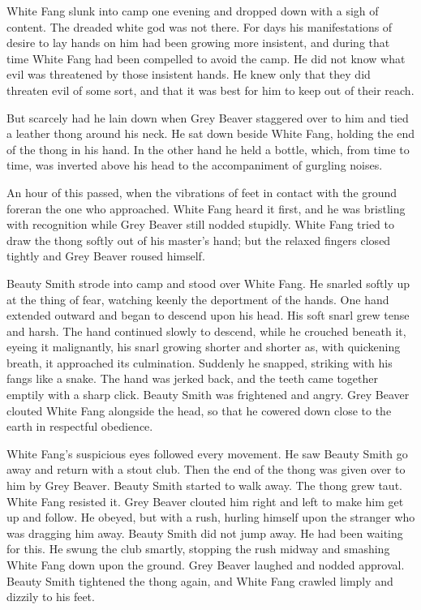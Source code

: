 \documentclass[10pt]{book}
\begin{document}
White Fang slunk into camp one evening and dropped down with a sigh of
content. The dreaded white god was not there. For days his
manifestations of desire to lay hands on him had been growing more
insistent, and during that time White Fang had been compelled to avoid
the camp. He did not know what evil was threatened by those insistent
hands. He knew only that they did threaten evil of some sort, and that
it was best for him to keep out of their reach.

But scarcely had he lain down when Grey Beaver staggered over to him
and tied a leather thong around his neck. He sat down beside White
Fang, holding the end of the thong in his hand. In the other hand he
held a bottle, which, from time to time, was inverted above his head to
the accompaniment of gurgling noises.

An hour of this passed, when the vibrations of feet in contact with the
ground foreran the one who approached. White Fang heard it first, and
he was bristling with recognition while Grey Beaver still nodded
stupidly. White Fang tried to draw the thong softly out of his master’s
hand; but the relaxed fingers closed tightly and Grey Beaver roused
himself.

Beauty Smith strode into camp and stood over White Fang. He snarled
softly up at the thing of fear, watching keenly the deportment of the
hands. One hand extended outward and began to descend upon his head.
His soft snarl grew tense and harsh. The hand continued slowly to
descend, while he crouched beneath it, eyeing it malignantly, his snarl
growing shorter and shorter as, with quickening breath, it approached
its culmination. Suddenly he snapped, striking with his fangs like a
snake. The hand was jerked back, and the teeth came together emptily
with a sharp click. Beauty Smith was frightened and angry. Grey Beaver
clouted White Fang alongside the head, so that he cowered down close to
the earth in respectful obedience.

White Fang’s suspicious eyes followed every movement. He saw Beauty
Smith go away and return with a stout club. Then the end of the thong
was given over to him by Grey Beaver. Beauty Smith started to walk
away. The thong grew taut. White Fang resisted it. Grey Beaver clouted
him right and left to make him get up and follow. He obeyed, but with a
rush, hurling himself upon the stranger who was dragging him away.
Beauty Smith did not jump away. He had been waiting for this. He swung
the club smartly, stopping the rush midway and smashing White Fang down
upon the ground. Grey Beaver laughed and nodded approval. Beauty Smith
tightened the thong again, and White Fang crawled limply and dizzily to
his feet.
\end{document}

